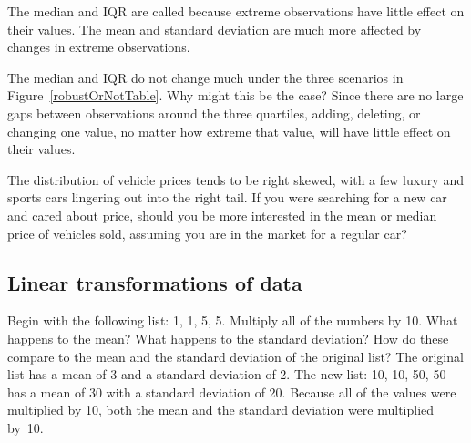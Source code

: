 The median and IQR are called  because extreme observations have little effect on their values. The mean and standard deviation are much more affected by changes in extreme observations.

\begin{examplewrap}
\begin{nexample}{The median and IQR do not change much under the three scenarios in Figure~\ref{robustOrNotTable}. Why might this be the case?}
Since there are no large gaps between observations around the three quartiles, adding, deleting, or changing one value, no matter how extreme that value, will have little effect on their values.
\end{nexample}
\end{examplewrap}

\begin{exercisewrap}
\begin{nexercise}
The distribution of vehicle prices tends to be right skewed, with a few luxury and sports cars lingering out into the right tail. If you were searching for a new car and cared about price, should you be more interested in the mean or median price of vehicles sold, assuming you are in the market for a regular car?\footnotemark\end{nexercise}
\end{exercisewrap}

\subsection{Linear transformations of data}
\label{linearTransformationOfData}

\begin{examplewrap}
\begin{nexample}{Begin with the following list:  {1, 1, 5, 5}. Multiply all of the numbers by 10. What happens to the mean? What happens to the standard deviation? How do these compare to the mean and the standard deviation of the original list?}
The original list has a mean of 3 and a standard deviation of 2. The new list: {10, 10, 50, 50} has a mean of 30 with a standard deviation of 20. Because all of the values were multiplied by 10, both the mean and the standard deviation were multiplied by~10.~\footnotemark
\end{nexample}
\end{examplewrap}

